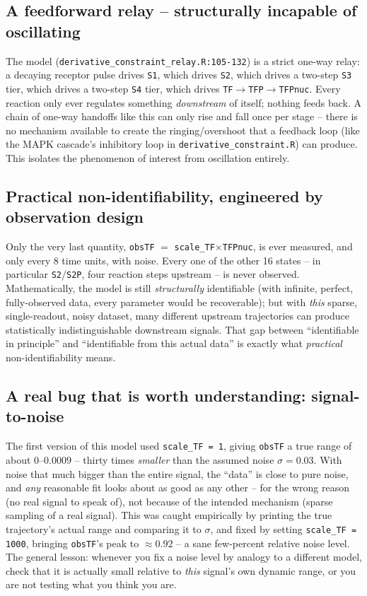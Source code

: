 \documentclass[11pt]{article}
\newcommand{\code}[1]{\texttt{#1}}
\newcommand{\file}[1]{\textcolor{black!60}{\texttt{#1}}}
\begin{document}
\subsection{A feedforward relay -- structurally incapable of oscillating}
The model (\file{derivative\_constraint\_relay.R:105-132}) is a strict
one-way relay: a decaying receptor pulse drives \code{S1}, which drives
\code{S2}, which drives a two-step \code{S3} tier, which drives a two-step
\code{S4} tier, which drives \code{TF}$\to$\code{TFP}$\to$\code{TFPnuc}.
Every reaction only ever regulates something \emph{downstream} of itself;
nothing feeds back. A chain of one-way handoffs like this can only rise and
fall once per stage -- there is no mechanism available to create the
ringing/overshoot that a feedback loop (like the MAPK cascade's inhibitory
loop in \file{derivative\_constraint.R}) can produce. This isolates the
phenomenon of interest from oscillation entirely.

\subsection{Practical non-identifiability, engineered by observation design}
Only the very last quantity, \code{obsTF} $=$
\code{scale\_TF}$\times$\code{TFPnuc}, is ever measured, and only every 8
time units, with noise. Every one of the other 16 states -- in particular
\code{S2}/\code{S2P}, four reaction steps upstream -- is never observed.
Mathematically, the model is still \emph{structurally} identifiable (with
infinite, perfect, fully-observed data, every parameter would be
recoverable); but with \emph{this} sparse, single-readout, noisy dataset,
many different upstream trajectories can produce statistically
indistinguishable downstream signals. That gap between ``identifiable in
principle'' and ``identifiable from this actual data'' is exactly what
\emph{practical} non-identifiability means.

\subsection{A real bug that is worth understanding: signal-to-noise}
The first version of this model used \code{scale\_TF = 1}, giving
\code{obsTF} a true range of about $0$--$0.0009$ -- thirty times
\emph{smaller} than the assumed noise $\sigma=0.03$. With noise that much
bigger than the entire signal, the ``data'' is close to pure noise, and
\emph{any} reasonable fit looks about as good as any other -- for the wrong
reason (no real signal to speak of), not because of the intended
mechanism (sparse sampling of a real signal). This was caught empirically
by printing the true trajectory's actual range and comparing it to
$\sigma$, and fixed by setting \code{scale\_TF = 1000}, bringing
\code{obsTF}'s peak to $\approx 0.92$ -- a sane few-percent relative noise
level. The general lesson: whenever you fix a noise level by analogy to a
different model, check that it is actually small relative to \emph{this}
signal's own dynamic range, or you are not testing what you think you are.
\end{document}
